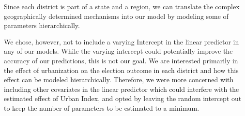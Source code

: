 \documentclass[12pt]{article}
\begin{document}
Since each district is part of a state and a region, we can translate the complex geographically determined mechanisms into our model by modeling some of parameters hierarchically.

We chose, however, not to include a varying Intercept in the linear predictor in any of our models. While the varying intercept could potentially improve the accuracy of our predictions, this is not our goal. We are interested primarily in the effect of urbanization on the election outcome in each district and how this effect can be modeled hierarchically. Therefore, we were more concerned with including other covariates in the linear predictor which could interfere with the estimated effect of Urban Index, and opted by leaving the random intercept out to keep the number of parameters to be estimated to a minimum.

\end{document}
